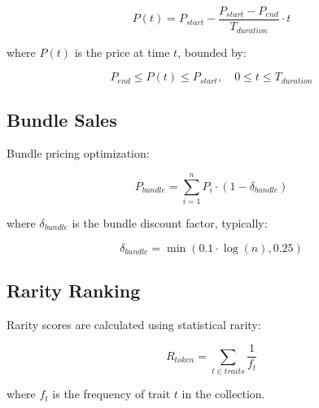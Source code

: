 \begin{equation}
P(t) = P_{start} - \frac{P_{start} - P_{end}}{T_{duration}} \cdot t
\end{equation}

where $P(t)$ is the price at time $t$, bounded by:

\begin{equation}
P_{end} \leq P(t) \leq P_{start}, \quad 0 \leq t \leq T_{duration}
\end{equation}

\subsection{Bundle Sales}

Bundle pricing optimization:

\begin{equation}
P_{bundle} = \sum_{i=1}^{n} P_i \cdot (1 - \delta_{bundle})
\end{equation}

where $\delta_{bundle}$ is the bundle discount factor, typically:

\begin{equation}
\delta_{bundle} = \min(0.1 \cdot \log(n), 0.25)
\end{equation}

\subsection{Rarity Ranking}

Rarity scores are calculated using statistical rarity:

\begin{equation}
R_{token} = \sum_{t \in traits} \frac{1}{f_t}
\end{equation}

where $f_t$ is the frequency of trait $t$ in the collection.

